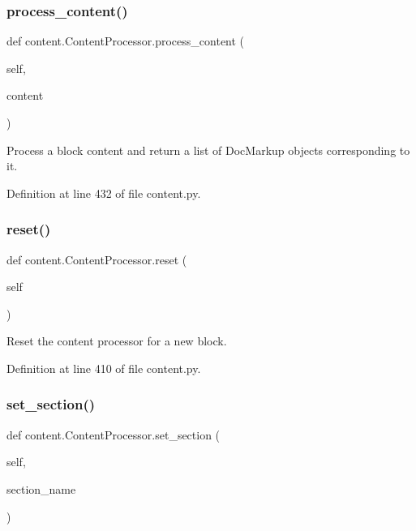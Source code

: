 \subsubsection{\texorpdfstring{process\+\_\+content()}{process\_content()}}
{\footnotesize\ttfamily def content.\+Content\+Processor.\+process\+\_\+content (\begin{DoxyParamCaption}\item[{}]{self,  }\item[{}]{content }\end{DoxyParamCaption})}

\begin{DoxyVerb}Process a block content and return a list of DocMarkup objects
   corresponding to it.\end{DoxyVerb}
 

Definition at line 432 of file content.\+py.

\mbox{\label{classcontent_1_1_content_processor_a50270833594711e862d06e5fea9131fa}} 
\subsubsection{\texorpdfstring{reset()}{reset()}}
{\footnotesize\ttfamily def content.\+Content\+Processor.\+reset (\begin{DoxyParamCaption}\item[{}]{self }\end{DoxyParamCaption})}

\begin{DoxyVerb}Reset the content processor for a new block.\end{DoxyVerb}
 

Definition at line 410 of file content.\+py.

\mbox{\label{classcontent_1_1_content_processor_a14e1401ef31e9e27d18a5d526697305f}} 
\subsubsection{\texorpdfstring{set\+\_\+section()}{set\_section()}}
{\footnotesize\ttfamily def content.\+Content\+Processor.\+set\+\_\+section (\begin{DoxyParamCaption}\item[{}]{self,  }\item[{}]{section\+\_\+name }\end{DoxyParamCaption})}

